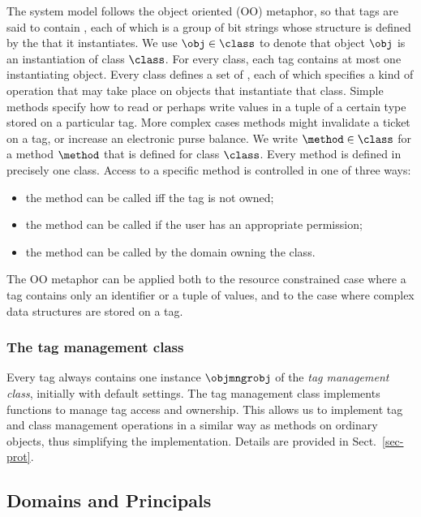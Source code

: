 The system model follows the object oriented (OO) metaphor, so that tags are
said to contain , each of which is a group of bit strings whose
structure is defined by the  that it instantiates.  
We use $\obj \in \class$ to denote that object $\obj$ is an instantiation of 
class $\class$.
For every class, each tag contains at most one instantiating object.
Every class defines a set of , each of which specifies a kind of
operation that may take place on objects that instantiate that class. Simple
methods specify how to read or perhaps write values in a tuple of a certain
type stored on a particular tag.  More complex cases methods might invalidate a
ticket on a tag, or increase an electronic purse balance.
We write $\method \in \class$ for a method $\method$ that is defined for 
class $\class$.  
Every method is defined in precisely one class.
Access to a specific method is controlled in one of three ways:
\begin{itemize}
	\item the method can be called iff the tag is not owned;
	\item the method can be called if the user has an appropriate permission;
	\item the method can be called by the domain owning the class.
\end{itemize}
The OO metaphor can be applied both to the resource constrained case where 
a tag contains only an identifier or a tuple of values, and to the case where 
complex data structures are stored on a tag.

\subsubsection{The tag management class}

Every tag always contains one instance $\objmngrobj$ of the \emph{tag management class},
initially with default settings. 
The tag management class implements functions to manage tag access and ownership. 
This allows us to implement tag and class management operations in a similar way as methods on ordinary objects, thus simplifying the implementation. Details are provided in Sect.~\ref{sec-prot}.

\subsection{Domains and Principals}

